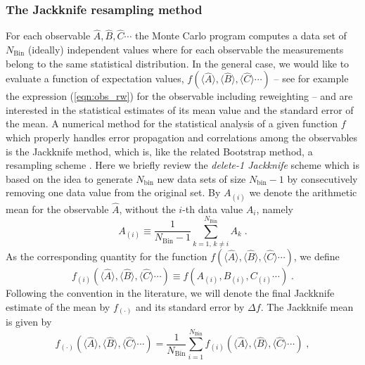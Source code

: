 \documentclass{SciPost}
\begin{document}
\subsubsection{The Jackknife resampling method}\label{sec:jack}
%
For each observable $\hat{A}, \hat{B},\hat{C} \cdots$ the Monte Carlo program computes a data set of $N_{\text{Bin}}$ (ideally) independent values where for each observable the measurements belong to the same  statistical distribution.  In the general case, we would like to evaluate a function of expectation values, $f(\langle \hat{A} \rangle, \langle \hat{B} \rangle, \langle \hat{C} \rangle  \cdots)$ --
see for example the expression (\ref{eqn:obs_rw}) for the observable including reweighting --
and are interested in the statistical estimates of its mean value  and the standard error of the mean.
A numerical method for the statistical analysis of a given function $f$ which properly handles error propagation and correlations among the observables is the Jackknife method, which is, like the related Bootstrap method, a resampling scheme \cite{efron1981}.
Here we briefly review the \textit{delete-1 Jackknife} scheme which is based on the idea to generate $N_{\text{bin}}$ new data sets of size $N_{\text{bin}}-1$ by consecutively removing one data value from the original set. By $A_{(i)}$ we denote the arithmetic mean for the observable $\hat{A}$, without the $i$-th data value $A_{i}$, namely
\begin{equation}
A_{(i)} \equiv \frac{1}{N_{\text{Bin}}-1} \sum\limits_{k=1,\,k\neq i}^{N_{\text{Bin}}} A_{k}\;.
\end{equation}
As the corresponding quantity for  the function $f(\langle \hat{A} \rangle, \langle \hat{B} \rangle, \langle \hat{C} \rangle  \cdots)$, we define 
\begin{equation}
f_{(i)}(\langle \hat{A} \rangle, \langle \hat{B} \rangle, \langle \hat{C} \rangle  \cdots) \equiv
f( A_{(i)}, B_{(i)},C_{(i)}\cdots)\;.
\end{equation}
Following the convention in the literature, we will denote the final Jackknife estimate of the mean by $f_{(\cdot)}$ and its standard error by $\Delta f$. The Jackknife mean is  given by
\begin{equation}
\label{eqn:jack_mean}
f_{(\cdot)}(\langle \hat{A} \rangle, \langle \hat{B} \rangle, \langle \hat{C} \rangle  \cdots) =
\frac{1}{N_{\text{Bin}}}\sum\limits_{i=1}^{N_{\text{Bin}}} f_{(i)}(\langle \hat{A} \rangle, \langle \hat{B} \rangle, \langle \hat{C} \rangle  \cdots)\;,
\end{equation}
\end{document}
